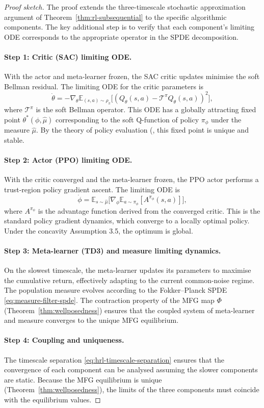 \begin{proof}[Proof sketch]
The proof extends the three-timescale stochastic approximation argument of
Theorem~\ref{thm:rl-subsequential} to the specific algorithmic components. The key
additional step is to verify that each component's limiting ODE corresponds to the
appropriate operator in the SPDE decomposition.

\paragraph{Step 1: Critic (SAC) limiting ODE.} With the actor and meta-learner
frozen, the SAC critic updates minimise the soft Bellman residual. The limiting ODE
for the critic parameters is
\[
    \dot\theta = -\nabla_\theta \mathbb{E}_{(s,a) \sim \rho_\pi}\big[ (Q_\theta(s,a) -
    \mathcal{T}^\pi Q_\theta(s,a))^2 \big],
\]
where $\mathcal{T}^\pi$ is the soft Bellman operator. This ODE has a globally
attracting fixed point $\theta^*(\phi, \hat\mu)$ corresponding to the soft Q-function
of policy $\pi_\phi$ under the measure $\hat\mu$. By the theory of policy evaluation
(\citep{suttonbarto2018}, this fixed point is unique and stable.

\paragraph{Step 2: Actor (PPO) limiting ODE.} With the critic converged and the
meta-learner frozen, the PPO actor performs a trust-region policy gradient ascent.
The limiting ODE is
\[
    \dot\phi = \mathbb{E}_{s \sim \hat\mu}\big[ \nabla_\phi \mathbb{E}_{a \sim
    \pi_\phi}[A^{\pi_\phi}(s,a)] \big],
\]
where $A^{\pi_\phi}$ is the advantage function derived from the converged critic.
This is the standard policy gradient dynamics, which converge to a locally optimal
policy. Under the concavity Assumption 3.5, the optimum is global.

\paragraph{Step 3: Meta-learner (TD3) and measure limiting dynamics.} On the
slowest timescale, the meta-learner updates its parameters to maximise the
cumulative return, effectively adapting to the current common-noise regime. The
population measure evolves according to the Fokker--Planck SPDE
\eqref{eq:measure-filter-spde}. The contraction property of the MFG map $\Phi$
(Theorem~\ref{thm:wellposedness}) ensures that the coupled system of meta-learner and
measure converges to the unique MFG equilibrium.

\paragraph{Step 4: Coupling and uniqueness.} The timescale separation
\eqref{eq:hrl-timescale-separation} ensures that the convergence of each component
can be analysed assuming the slower components are static. Because the MFG
equilibrium is unique (Theorem~\ref{thm:wellposedness}), the limits of the three
components must coincide with the equilibrium values.
\end{proof}

